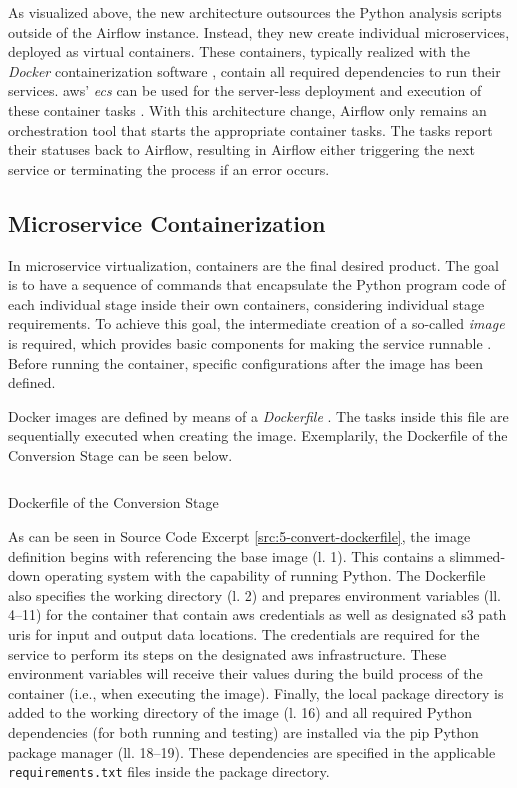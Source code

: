 As visualized above, the new architecture outsources the Python analysis scripts outside of the Airflow instance. Instead, they new create individual microservices, deployed as virtual containers. These containers, typically realized with the \textit{Docker} containerization software \cite{docker}, contain all required dependencies to run their services. \ac{aws}' \textit{\ac{ecs}} can be used for the server-less deployment and execution of these container tasks \cite{ecs}. With this architecture change, Airflow only remains an orchestration tool that starts the appropriate container tasks. The tasks report their statuses back to Airflow, resulting in Airflow either triggering the next service or terminating the process if an error occurs.

\subsection{Microservice Containerization}
In microservice virtualization, containers are the final desired product. The goal is to have a sequence of commands that encapsulate the Python program code of each individual stage inside their own containers, considering individual stage requirements. To achieve this goal, the intermediate creation of a so-called \textit{image} is required, which provides basic components for making the service runnable \cite{docker}. Before running the container, specific configurations after the image has been defined.

Docker images are defined by means of a \textit{Dockerfile} \cite{docker}. The tasks inside this file are sequentially executed when creating the image. Exemplarily, the Dockerfile of the Conversion Stage can be seen below.
\newpage
\begin{listing}
	\inputminted{dockerfile}{main-matter/src/5-convert-dockerfile}
	\caption{Dockerfile of the Conversion Stage}
	\label{src:5-convert-dockerfile}
\end{listing}

As can be seen in Source Code Excerpt \ref{src:5-convert-dockerfile}, the image definition begins with referencing the base image (l. 1). This contains a slimmed-down operating system with the capability of running Python. The Dockerfile also specifies the working directory (l. 2) and prepares environment variables (ll. 4--11) for the container that contain \ac{aws} credentials as well as designated \ac{s3} path \acp{uri} for input and output data locations. The credentials are required for the service to perform its steps on the designated \ac{aws} infrastructure. These environment variables will receive their values during the build process of the container (i.e., when executing the image). Finally, the local package directory is added to the working directory of the image (l. 16) and all required Python dependencies (for both running and testing) are installed via the \acs{pip} Python package manager (ll. 18--19). These dependencies are specified in the applicable \texttt{requirements.txt} files inside the package directory.

